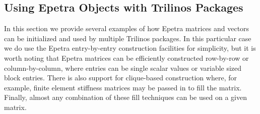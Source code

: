 \documentclass[acmtoms,acmnow]{acmtrans2m}
\begin{document}
%
%

\subsection{Using Epetra Objects with Trilinos Packages}

In this section we provide several examples of how Epetra matrices and
vectors can be initialized and used by multiple
Trilinos packages.  In this particular case we do use the Epetra
entry-by-entry construction facilities for simplicity, but it is
worth noting that Epetra matrices can be efficiently constructed
row-by-row or column-by-column, where entries can be
single scalar values or variable sized block entries.  There is also
support for clique-based construction where, for example, finite element
stiffness matrices may be passed in to fill the matrix.  Finally,
almost any combination of these fill techniques can be used on a given
matrix.
\end{document}
